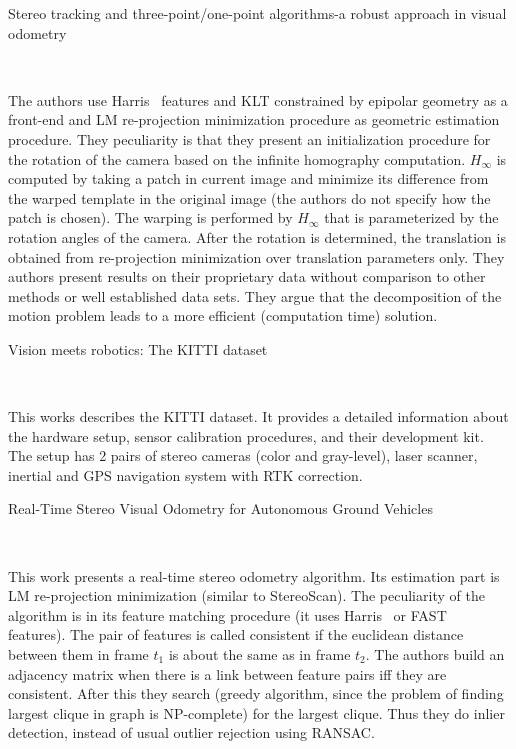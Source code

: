 \documentclass[10pt]{article}         %
\begin{document}
\begin{enumerate}
  {\Large \item Stereo tracking and three-point/one-point algorithms-a robust approach in visual odometry}~\cite{ni2006stereo}

  The authors use Harris~\cite{harris1988combined} features and KLT
  constrained by epipolar geometry as a front-end and LM re-projection
  minimization procedure as geometric estimation procedure.  They
  peculiarity is that they present an initialization procedure for the
  rotation of the camera based on the infinite homography
  computation. $H_{\infty}$ is computed by taking a patch in current
  image and minimize its difference from the warped template in the
  original image (the authors do not specify how the patch is chosen).
  The warping is performed by $H_{\infty}$ that is parameterized by the
  rotation angles of the camera. After the rotation is determined, the
  translation is obtained from re-projection minimization over
  translation parameters only. They authors present results on their
  proprietary data without comparison to other methods or well
  established data sets.  They argue that the decomposition of the
  motion problem leads to a more efficient (computation time)
  solution.

  {\Large \item Vision meets
    robotics: The KITTI dataset}~\cite{geiger2013vision}

  This works describes the KITTI dataset. It provides a detailed
  information about the hardware setup, sensor calibration procedures,
  and their development kit.  The setup has 2 pairs of stereo cameras
  (color and gray-level), laser scanner, inertial and GPS navigation
  system with RTK correction.

  {\Large \item Real-Time Stereo Visual Odometry for Autonomous Ground
    Vehicles}~\cite{howard2008real}

  This work presents a real-time stereo odometry algorithm.  Its
  estimation part is LM re-projection minimization (similar to
  StereoScan).  The peculiarity of the algorithm is in its feature
  matching procedure (it uses Harris~\cite{harris1988combined} or
  FAST~\cite{rosten2006machine} features).  The pair of features is
  called consistent if the euclidean distance between them in frame
  $t_1$ is about the same as in frame $t_2$.  The authors build an
  adjacency matrix when there is a link between feature pairs iff they
  are consistent.  After this they search (greedy algorithm, since the
  problem of finding largest clique in graph is NP-complete) for the
  largest clique.  Thus they do inlier detection, instead of usual
  outlier rejection using RANSAC.


\end{enumerate}
\end{document}
